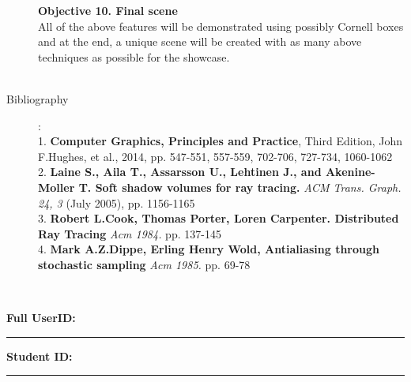 \documentclass {article}
\begin{document}
\begin{description}
	 {\bf Objective 10. Final scene}\\
	 All of the above features will be demonstrated using possibly Cornell boxes and at the end, a unique scene will be created with as
	 many above techniques as possible for the showcase.\\
	 \\

\item[Bibliography]:\\
	 1. {\bf Computer Graphics, Principles and Practice}, Third Edition, John F.Hughes, et al., 2014,
	 pp. 547-551, 557-559, 702-706, 727-734, 1060-1062 \\
	 2. {\bf Laine S., Aila T., Assarsson U., Lehtinen J., and Akenine-Moller T. Soft shadow volumes
	 for ray tracing.} {\it ACM Trans. Graph. 24, 3} (July 2005), pp. 1156-1165 \\
	 3. {\bf Robert L.Cook, Thomas Porter, Loren Carpenter. Distributed Ray Tracing} {\it Acm 1984.} pp. 137-145 \\
	 4. {\bf Mark A.Z.Dippe, Erling Henry Wold, Antialiasing through stochastic sampling} {\it Acm 1985.} pp. 69-78 \\

\end{description}


\\

{\hfill{\bf Full UserID:\rule{2in}{.1mm}}\hfill{\bf Student ID:\rule{2in}{.1mm}}\hfill}
\end{document}

